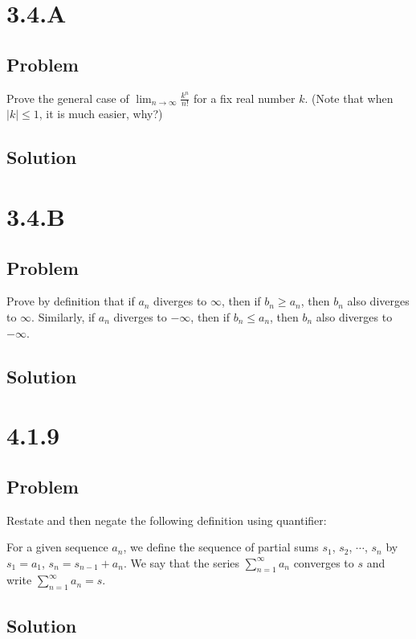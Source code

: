 \documentclass[12pt]{article}
\newcommand{\abs}  [1]{\left|       #1 \right|      }
\begin{document}
\section*{3.4.A}

\subsection*{Problem}
Prove the general case of $\lim_{n \to \infty} \frac{k^n}{n!}$ for a fix real number $k$. (Note that when $\abs{k} \leq 1$, it is much easier, why?)

\subsection*{Solution}



\section*{3.4.B}

\subsection*{Problem}
Prove by definition that if $a_n$ diverges to $\infty$, then if $b_n \geq a_n$, then $b_n$ also diverges to $\infty$. Similarly, if $a_n$ diverges to $-\infty$, then if $b_n \leq a_n$, then $b_n$ also diverges to $-\infty$.

\subsection*{Solution}



\section*{4.1.9}

\subsection*{Problem}
Restate and then negate the following definition using quantifier:

For a given sequence $a_n$, we define the sequence of partial sums $s_1$, $s_2$, $\cdots$, $s_n$ by $s_1 = a_1$, $s_n = s_{n - 1} + a_n$. We say that the series $\sum_{n = 1}^\infty a_n$ converges to $s$ and write $\sum_{n = 1}^\infty a_n = s$.

\subsection*{Solution}
\end{document}
